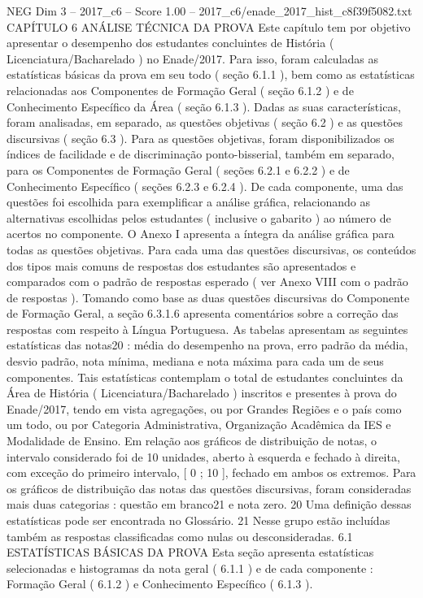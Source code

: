 \begin{textsample}{NEG Dim 3 – 2017\_c6 – Score 1.00 – 2017\_c6/enade\_2017\_hist\_c8f39f5082.txt}  \label{ex:f3_neg_090}
CAPÍTULO 6 ANÁLISE TÉCNICA DA PROVA Este capítulo tem por objetivo apresentar o desempenho dos estudantes concluintes de História ( Licenciatura/Bacharelado ) no Enade/2017.
Para isso, foram calculadas as estatísticas básicas da prova em seu todo ( seção 6.1.1 ), bem como as estatísticas relacionadas aos Componentes de Formação Geral ( seção 6.1.2 ) e de Conhecimento Específico da Área ( seção 6.1.3 ).
Dadas as suas características, foram analisadas, em separado, as questões objetivas ( seção 6.2 ) e as questões discursivas ( seção 6.3 ).
Para as questões objetivas, foram disponibilizados os índices de facilidade e de discriminação ponto-bisserial, também em separado, para os Componentes de Formação Geral ( seções 6.2.1 e 6.2.2 ) e de Conhecimento Específico ( seções 6.2.3 e 6.2.4 ).
De cada componente, uma das questões foi escolhida para exemplificar a análise gráfica, relacionando as alternativas escolhidas pelos estudantes ( inclusive o gabarito ) ao número de acertos no componente.
O Anexo I apresenta a íntegra da análise gráfica para todas as questões objetivas.
Para cada uma das questões discursivas, os conteúdos dos tipos mais comuns de respostas dos estudantes são apresentados e comparados com o padrão de respostas esperado ( ver Anexo VIII com o padrão de respostas ).
Tomando como base as duas questões discursivas do Componente de Formação Geral, a seção 6.3.1.6 apresenta comentários sobre a correção das respostas com respeito à Língua Portuguesa.
As tabelas apresentam as seguintes estatísticas das notas20 : média do desempenho na prova, erro padrão da média, desvio padrão, nota mínima, mediana e nota máxima para cada um de seus componentes.
Tais estatísticas contemplam o total de estudantes concluintes da Área de História ( Licenciatura/Bacharelado ) inscritos e presentes à prova do Enade/2017, tendo em vista agregações, ou por Grandes Regiões e o país como um todo, ou por Categoria Administrativa, Organização Acadêmica da IES e Modalidade de Ensino.
Em relação aos gráficos de distribuição de notas, o intervalo considerado foi de 10 unidades, aberto à esquerda e fechado à direita, com exceção do primeiro intervalo, [ 0 ; 10 ], fechado em ambos os extremos.
Para os gráficos de distribuição das notas das questões discursivas, foram consideradas mais duas categorias : questão em branco21 e nota zero. 20 Uma definição dessas estatísticas pode ser encontrada no Glossário. 21 Nesse grupo estão incluídas também as respostas classificadas como nulas ou desconsideradas. 6.1 ESTATÍSTICAS BÁSICAS DA PROVA Esta seção apresenta estatísticas selecionadas e histogramas da nota geral ( 6.1.1 ) e de cada componente : Formação Geral ( 6.1.2 ) e Conhecimento Específico ( 6.1.3 ).

\end{textsample}
